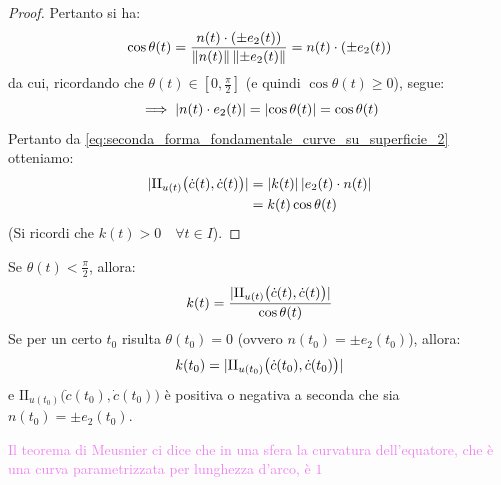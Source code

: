 \begin{proof}
        Pertanto si ha:
        \[
        \cos\theta(t) = \frac{n(t) \cdot (\pm e_2(t))}{\lVert n(t)\rVert \, \lVert\pm e_2(t)\rVert} = n(t) \cdot (\pm e_2(t))
        \]
        da cui, ricordando che $\theta(t) \in \left[0, \frac{\pi}{2}\right]$ (e quindi $\cos\theta(t) \ge 0$), segue:
        \[
        \implies \lvert n(t) \cdot e_2(t)\rvert = \lvert\cos\theta(t)\rvert = \cos\theta(t)
        \]
        Pertanto da \eqref{eq:seconda_forma_fondamentale_curve_su_superficie_2} otteniamo:
        \begin{align*}
        \lvert\mathrm{II}_{u(t)}\big(\dot{c}(t), \dot{c}(t)\big)\rvert &= \lvert k(t)\rvert \, \lvert e_2(t) \cdot n(t)\rvert \\
        &= k(t) \cos\theta(t)
        \end{align*}
        (Si ricordi che $k(t) > 0 \quad \forall t \in I$).
        \end{proof}

        \begin{osservazione}
        Se $\theta(t) < \frac{\pi}{2}$, allora:
        \[
        k(t) = \frac{\lvert\mathrm{II}_{u(t)}\big(\dot{c}(t), \dot{c}(t)\big)\rvert}{\cos\theta(t)}
        \]
        Se per un certo $t_0$ risulta $\theta(t_0) = 0$ (ovvero $n(t_0) = \pm e_2(t_0)$), allora:
        \[
        k(t_0) = \lvert\mathrm{II}_{u(t_0)}\big(\dot{c}(t_0), \dot{c}(t_0)\big)\rvert
        \]
        e $\mathrm{II}_{u(t_0)}\big(\dot{c}(t_0), \dot{c}(t_0)\big)$ è positiva o negativa a seconda che sia $n(t_0) = \pm e_2(t_0)$.

        \textcolor{violet}{Il teorema di Meusnier ci dice che in una sfera la curvatura dell'equatore, che è una curva parametrizzata per lunghezza d'arco, 
        è $1$}
        \end{osservazione}
